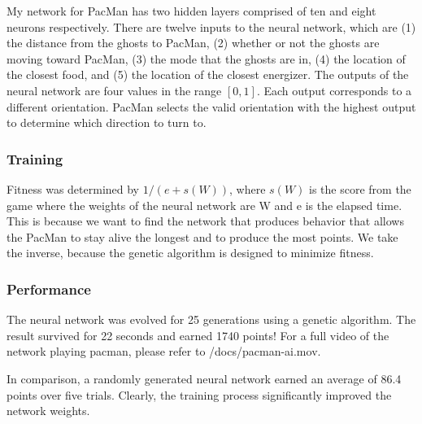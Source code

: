\documentclass{article}
\begin{document}
My network for PacMan has two hidden layers comprised of ten and eight neurons
respectively. There are twelve inputs to the neural network, which are (1) the
distance from the ghosts to PacMan, (2) whether or not the ghosts are moving
toward PacMan, (3) the mode that the ghosts are in, (4) the location of the
closest food, and (5) the location of the closest energizer. The outputs of the
neural network are four values in the range $[0, 1]$. Each output corresponds to
a different orientation. PacMan selects the valid orientation with the highest
output to determine which direction to turn to.

\subsubsection{Training}
Fitness was determined by $1 / (e + s(W))$, where $s(W)$ is the score from the
game where the weights of the neural network are W and e is the elapsed time.
This is because we want to find the network that produces behavior that allows
the PacMan to stay alive the longest and to produce the most points. We take the
inverse, because the genetic algorithm is designed to minimize fitness.

\subsubsection{Performance}
The neural network was evolved for 25 generations using a genetic algorithm.
The result survived for 22 seconds and earned 1740 points! For a full video of
the network playing pacman, please refer to /docs/pacman-ai.mov.

In comparison, a randomly generated neural network earned an average of 86.4
points over five trials. Clearly, the training process significantly improved
the network weights.
\end{document}

